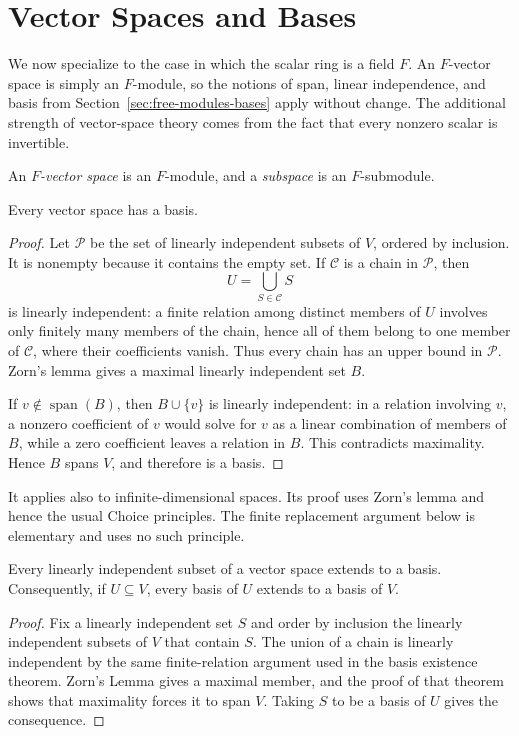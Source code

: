 \section{Vector Spaces and Bases}\label{sec:vector-spaces-bases}
We now specialize to the case in which the scalar ring is a field \(F\).
An \(F\)-vector space is simply an \(F\)-module, so the notions of span,
linear independence, and basis from Section~\ref{sec:free-modules-bases} apply without
change. The additional strength of vector-space theory comes from the fact
that every nonzero scalar is invertible.

\begin{definition}
An \emph{\(F\)-vector space} is an \(F\)-module, and a \emph{subspace} is an
\(F\)-submodule.
\end{definition}

\begin{theorem}
Every vector space has a basis.
\end{theorem}
\begin{proof}
Let \(\mathcal P\) be the set of linearly independent subsets of \(V\),
ordered by inclusion. It is nonempty because it contains the empty set. If
\(\mathcal C\) is a chain in \(\mathcal P\), then
\[
U=\bigcup_{S\in\mathcal C}S
\]
is linearly independent: a finite relation among distinct members of \(U\)
involves only finitely many members of the chain, hence all of them belong to
one member of \(\mathcal C\), where their coefficients vanish. Thus every
chain has an upper bound in \(\mathcal P\). Zorn's lemma gives a maximal
linearly independent set \(B\).

If \(v\notin\operatorname{span}(B)\), then \(B\cup\{v\}\) is linearly
independent: in a relation involving \(v\), a nonzero coefficient of \(v\)
would solve for \(v\) as a linear combination of members of \(B\), while a
zero coefficient leaves a relation in \(B\). This contradicts maximality.
Hence \(B\) spans \(V\), and therefore is a basis.
\end{proof}

\begin{remark}
It applies also to infinite-dimensional spaces. Its proof uses Zorn's lemma
and hence the usual Choice principles. The finite
replacement argument below is elementary and uses no such principle.
\end{remark}

\begin{theorem}
Every linearly independent subset of a vector space extends to a basis.
Consequently, if \(U\subseteq V\), every basis of \(U\) extends to a basis of
\(V\).
\end{theorem}
\begin{proof}
Fix a linearly independent set \(S\) and order by inclusion the linearly
independent subsets of \(V\) that contain \(S\).  The union of a chain is
linearly independent by the same finite-relation argument used in the basis
existence theorem.  Zorn's Lemma gives a maximal member, and the proof of that
theorem shows that maximality forces it to span \(V\).  Taking \(S\) to be a
basis of \(U\) gives the consequence.
\end{proof}

